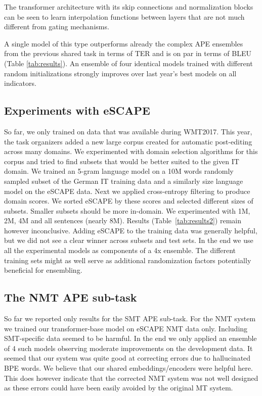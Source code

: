 \documentclass[11pt,a4paper]{article}
\begin{document}
The transformer architecture with its skip connections and normalization blocks can be seen to learn interpolation functions between layers that are not much different from gating mechanisms.  

A single model of this type outperforms already the complex APE ensembles from the previous shared task in terms of TER and is on par in terms of BLEU (Table \ref{tab:results}). An ensemble of four identical models trained with different random initializations strongly improves over last year's best models on all indicators. 

\subsection{Experiments with eSCAPE}

So far, we only trained on data that was available during WMT2017. This year, the task organizers added a new large corpus  created for automatic post-editing across many domains. We experimented with domain selection algorithms for this corpus and tried to find subsets that would be better suited to the given IT domain. We trained an 5-gram language model on a 10M words randomly sampled subset of the German IT training data and a similarly size language model on the eSCAPE data. Next we applied cross-entropy filtering \cite{moore-lewis:2010:Short} to produce domain scores. We sorted eSCAPE by these scores and selected different sizes of subsets. Smaller subsets should be more in-domain. We experimented with 1M, 2M, 4M and all sentences (nearly 8M). 
Results (Table~\ref{tab:results2}) remain however inconclusive. Adding eSCAPE to the training data was generally helpful, but we did not see a clear winner across subsets and test sets. In the end we use all the experimental models as components of a 4x ensemble. The different training sets might as well serve as additional randomization factors potentially beneficial for ensembling. 

\subsection{The NMT APE sub-task}
So far we reported only results for the SMT APE sub-task. For the NMT system we trained our transformer-base model on eSCAPE NMT data only. Including SMT-specific data seemed to be harmful. In the end we only applied an ensemble of 4 such models observing moderate improvements on the development data. It seemed that our system was quite good at correcting errors due to hallucinated BPE words. We believe that our shared embeddings/encoders were helpful here. This does however indicate that the corrected NMT system was not well designed as these errors could have been easily avoided by the original MT system.
\end{document}
